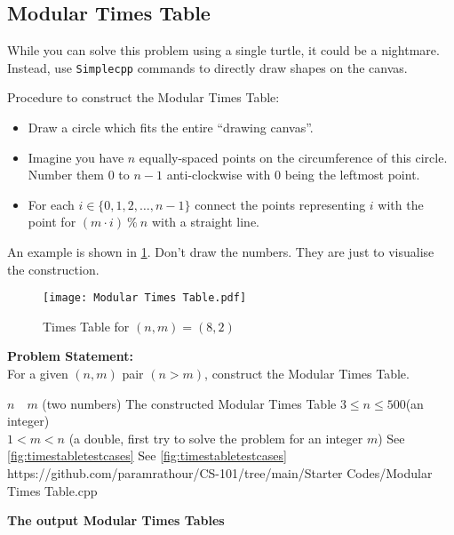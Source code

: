 \documentclass[../../Problems]{subfiles}
\begin{document}
\recalctypearea
\subsection{Modular Times Table}{\label{pp:timestable}}
\begin{note}
While you can solve this problem using a single turtle, it could be a nightmare. Instead, use \verb!Simplecpp! commands to directly draw shapes on the canvas.
\end{note}
Procedure to construct the Modular Times Table:
\begin{itemize}
	\item Draw a circle which fits the entire ``drawing canvas''.
	\item Imagine you have $n$ equally-spaced points on the circumference of this circle. Number them $0$ to $n-1$ anti-clockwise with $0$ being the leftmost point.
	\item For each $i \in \{0,1,2,\ldots,n-1\}$ connect the points representing $i$ with the point for $(m\cdot i)\ \%\ n$ with a straight line.
\end{itemize} An example is shown in \ref{fig:timestable}. Don't draw the numbers. They are just to visualise the construction.
\begin{figure}[H]
	\centering
	\texttt{[image: Modular Times Table.pdf]}
	\caption{Times Table for $(n,m)=(8,2)$}
	\label{fig:timestable}
\end{figure}
\vspace*{-2em}
\textbf{Problem Statement:}\\
For a given $(n,m)$ pair $(n>m)$, construct the Modular Times Table.
\begin{testcases}
	{$n\quad m$ \hfill(two numbers)}
	{The constructed Modular Times Table}
	{$3 \leq n \leq 500$\hfill(an integer)\\
	$1 < m < n$ \hfill(a double, first try to solve the problem for an integer $m$)}
	{See \ref{fig:timestabletestcases}}
	{See \ref{fig:timestabletestcases}}
	{https://github.com/paramrathour/CS-101/tree/main/Starter Codes/Modular Times Table.cpp}
\end{testcases}
\textbf{The output Modular Times Tables}
\end{document}
